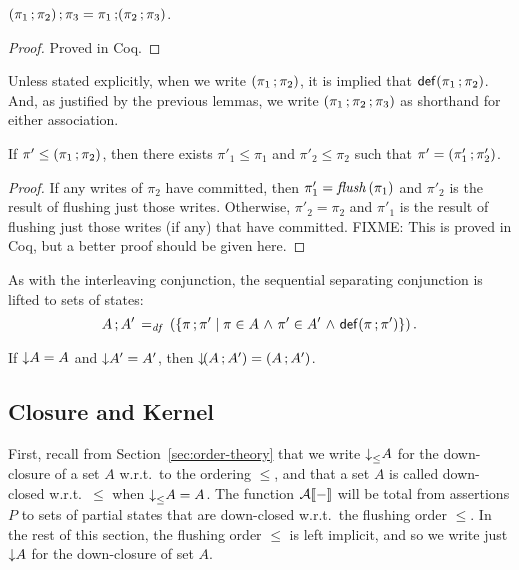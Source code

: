 \documentclass[11pt]{report}
\begin{document}
\begin{lemma}[Associativity]
	\label{lem:seq-assoc}
	$(\pi_1 \operatorname{;} \pi_2) \operatorname{;} \pi_3 = \pi_1 \operatorname{;} (\pi_2 \operatorname{;} \pi_3)$. 
\end{lemma} 

\begin{proof}
	Proved in Coq.
\end{proof}

Unless stated explicitly, when we write $(\pi_1 \operatorname{;} \pi_2)$, it is implied that $\mathsf{def}(\pi_1 \operatorname{;} \pi_2)$. And, as justified by the previous lemmas, we write $(\pi_1 \operatorname{;} \pi_2 \operatorname{;} \pi_3)$ as shorthand for either association. 
 
\begin{lemma}
	\label{lem:seq-down}
	If $\pi' \leq (\pi_1 \operatorname{;} \pi_2)$, then there exists $\pi'_1 \leq \pi_1$ and $\pi'_2 \leq \pi_2$ such that $\pi' = (\pi'_1 \operatorname{;} \pi'_2)$. 
\end{lemma}

\begin{proof}
	If any writes of $\pi_2$ have committed, then $\pi'_1 = \mathit{flush}\left(\pi_1\right)$ and $\pi'_2$ is the result of flushing just those writes. Otherwise, $\pi'_2 = \pi_2$ and $\pi'_1$ is the result of flushing just those writes (if any) that have committed. FIXME: This is proved in Coq, but a better proof should be given here. 
\end{proof}

As with the interleaving conjunction, the sequential separating conjunction is lifted to sets of states: \[ A \operatorname{;} A' \operatorname{\;=_{\mathit{df}}\;} \left(\left\lbrace \pi \operatorname{;} \pi' \mid \pi \in A \operatorname{\,\wedge\,} \pi' \in A' \operatorname{\,\wedge\,} \mathsf{def}(\pi \operatorname{;} \pi') \right\rbrace\right).\] 

\begin{lemma}
	\label{lem:seq-closure}
	If $\operatorname{\downarrow}\!A = A$ and $\operatorname{\downarrow}\!A' = A'$, then $\operatorname{\downarrow}\!(A \operatorname{;} A') = (A \operatorname{;} A')$. 
\end{lemma}
	
\subsection{Closure and Kernel}

First, recall from Section~\ref{sec:order-theory} that we write $\operatorname{\downarrow}_{\leq}\!A$ for the down-closure of a set $A$ w.r.t.~to the ordering $\leq$, and that a set $A$ is called down-closed w.r.t.~$\leq$ when $\operatorname{\downarrow}_{\leq}\!A = A$. The function $\mathcal{A}[\![-]\!]$ will be total from assertions $P$ to sets of partial states that are down-closed w.r.t.~the flushing order $\leq$. In the rest of this section, the flushing order $\leq$ is left implicit, and so we write just $\operatorname{\downarrow}\!A$ for the down-closure of set $A$.
\end{document}
